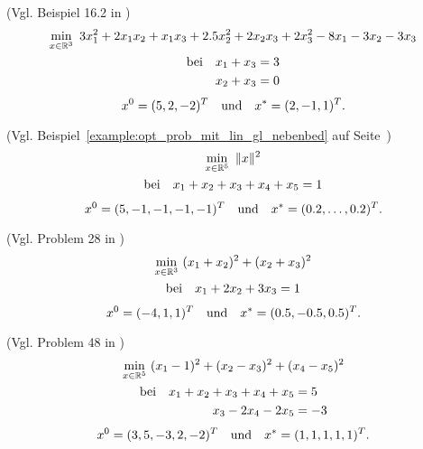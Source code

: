\begin{testproblem}
\label{test_prob:prob_A_nocedal}
(Vgl. Beispiel 16.2 in \cite[S.~452]{nocedal})
\begin{gather}
\min_{x\in\mathbb{R}^3}\ 3 x_1^2 + 2 x_1 x_2 + x_1 x_3 + 2.5 x_2^2 + 2 x_2 x_3 + 2 x_3^2 - 8 x_1 - 3 x_2 - 3 x_3 \notag \\
\begin{split}
\text{bei}\quad x_1 + x_3 & = 3 \\
x_2 + x_3 & = 0 \\
\end{split}
\end{gather}
\begin{equation*}
x^0 = (5, 2, -2)^T \quad\text{und}\quad x^* = (2, -1, 1)^T.
\end{equation*}
\end{testproblem}

\begin{testproblem}
(Vgl. Beispiel~\ref{example:opt_prob_mit_lin_gl_nebenbed} auf Seite~\pageref{example:opt_prob_mit_lin_gl_nebenbed})
\begin{gather}
\min_{x\in\mathbb{R}^5}\ \| x \|^2 \notag \\
\begin{split}
\text{bei}\quad x_1 + x_2 + x_3 + x_4 + x_5 & = 1 \\
\end{split}
\end{gather}
\begin{equation*}
x^0 = (5, -1, -1, -1, -1)^T \quad\text{und}\quad x^* = (0.2, \ldots, 0.2)^T.
\end{equation*}
\end{testproblem}

\begin{testproblem}
(Vgl. Problem 28 in \cite[S.~51]{hock})
\begin{gather}
\min_{x\in\mathbb{R}^3}\ (x_1 + x_2)^2 + (x_2 + x_3)^2 \notag \\
\begin{split}
\text{bei}\quad x_1 + 2 x_2 + 3 x_3 & = 1 \\
\end{split}
\end{gather}
\begin{equation*}
x^0 = (-4, 1, 1)^T \quad\text{und}\quad x^* = (0.5, -0.5, 0.5)^T.
\end{equation*}
\end{testproblem}

\begin{testproblem}
(Vgl. Problem 48 in \cite[S.~71]{hock})
\begin{gather}
\min_{x\in\mathbb{R}^5}\ (x_1 - 1)^2 + (x_2 - x_3)^2 + (x_4 - x_5)^2 \notag \\
\begin{split}
\text{bei}\quad x_1 + x_2 + x_3 + x_4 + x_5 & = 5 \\
x_3 - 2 x_4 - 2 x_5 & = -3 \\
\end{split}
\end{gather}
\begin{equation*}
x^0 = (3, 5, -3, 2, -2)^T \quad\text{und}\quad x^* = (1, 1, 1, 1, 1)^T.
\end{equation*}
\end{testproblem}

